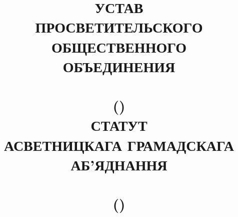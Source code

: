 
\title{\Large%
УСТАВ\\%
\textbf{\large ПРОСВЕТИТЕЛЬСКОГО ОБЩЕСТВЕННОГО ОБЪЕДИНЕНИЯ}\\%
\RuName\\[1ex]%
(\XC)\\[4ex]%
СТАТУТ\\%
\textbf{\large АСВЕТНИЦКАГА ГРАМАДСКАГА АБ’ЯДНАННЯ}\\%
\ByName\\[1ex]%
(\ByShort)%
}

\maketitle
